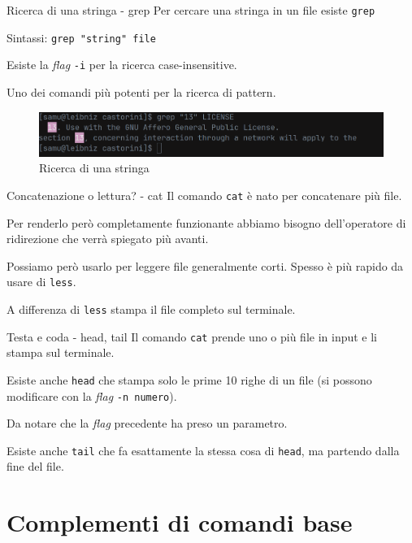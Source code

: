 \documentclass{beamer}
\begin{document}
\begin{frame}{Ricerca di una stringa - grep}
  Per cercare una stringa in un file esiste \texttt{grep}\bigskip

  Sintassi: \texttt{grep "string" file}\bigskip

  Esiste la \textit{flag} \texttt{-i} per la ricerca case-insensitive.\bigskip

  Uno dei comandi più potenti per la ricerca di pattern.
  \begin{figure}
    \includegraphics[width=\textwidth]{assets/command-grep.png}
    \caption{Ricerca di una stringa}
  \end{figure}
\end{frame}

\begin{frame}{Concatenazione o lettura? - cat}
  Il comando \texttt{cat} è nato per concatenare più file.\bigskip

  Per renderlo però completamente funzionante abbiamo bisogno dell'operatore
  di ridirezione che verrà spiegato più avanti.\bigskip

  Possiamo però usarlo per leggere file generalmente corti. Spesso è più rapido
  da usare di \texttt{less}.\bigskip

  A differenza di \texttt{less} stampa il file completo sul terminale.
\end{frame}

\begin{frame}{Testa e coda - head, tail}
  Il comando \texttt{cat} prende uno o più file in input e li stampa sul 
  terminale.\bigskip

  Esiste anche \texttt{head} che stampa solo le prime 10 righe di un file (si
  possono modificare con la \textit{flag} \texttt{-n numero}).\medskip

  Da notare che la \textit{flag} precedente ha preso un parametro.\bigskip

  Esiste anche \texttt{tail} che fa esattamente la stessa cosa di \texttt{head}, 
  ma partendo dalla fine del file.
\end{frame}

\section{Complementi di comandi base}
\end{document}
